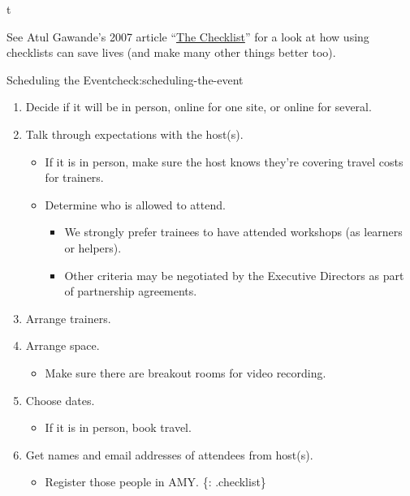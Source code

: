 t


See Atul Gawande's 2007 article
``\href{http://www.newyorker.com/magazine/2007/12/10/the-checklist}{The
Checklist}'' for a look at how using checklists can save lives (and make
many other things better too).

\begin{checklist}{Scheduling the Event}{check:scheduling-the-event}

\begin{enumerate}
\item
  Decide if it will be in person, online for one site, or online for
  several.
\item
  Talk through expectations with the host(s).

  \begin{itemize}
    \item
    If it is in person, make sure the host knows they're covering travel
    costs for trainers.
  \item
    Determine who is allowed to attend.

    \begin{itemize}
        \item
      We strongly prefer trainees to have attended workshops (as
      learners or helpers).
    \item
      Other criteria may be negotiated by the Executive Directors as
      part of partnership agreements.
    \end{itemize}
  \end{itemize}

\item
  Arrange trainers.

\item
  Arrange space.

  \begin{itemize}
    \item
    Make sure there are breakout rooms for video recording.
  \end{itemize}

\item
  Choose dates.

  \begin{itemize}
    \item
    If it is in person, book travel.
  \end{itemize}

\item
  Get names and email addresses of attendees from host(s).

  \begin{itemize}
    \item
    Register those people in AMY. \{: .checklist\}
  \end{itemize}
\end{enumerate}
\end{checklist}


